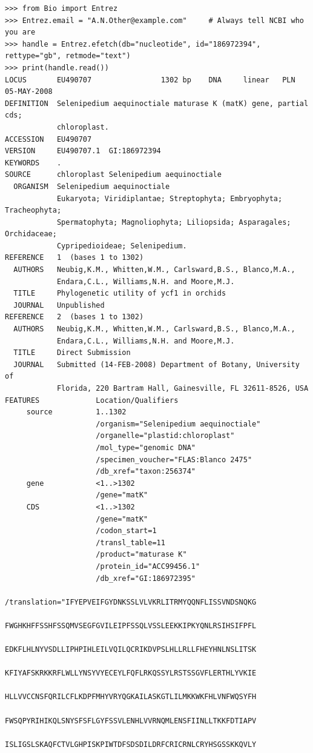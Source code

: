 \documentclass{report}
\begin{document}
\begin{verbatim}
>>> from Bio import Entrez
>>> Entrez.email = "A.N.Other@example.com"     # Always tell NCBI who you are
>>> handle = Entrez.efetch(db="nucleotide", id="186972394", rettype="gb", retmode="text")
>>> print(handle.read())
LOCUS       EU490707                1302 bp    DNA     linear   PLN 05-MAY-2008
DEFINITION  Selenipedium aequinoctiale maturase K (matK) gene, partial cds;
            chloroplast.
ACCESSION   EU490707
VERSION     EU490707.1  GI:186972394
KEYWORDS    .
SOURCE      chloroplast Selenipedium aequinoctiale
  ORGANISM  Selenipedium aequinoctiale
            Eukaryota; Viridiplantae; Streptophyta; Embryophyta; Tracheophyta;
            Spermatophyta; Magnoliophyta; Liliopsida; Asparagales; Orchidaceae;
            Cypripedioideae; Selenipedium.
REFERENCE   1  (bases 1 to 1302)
  AUTHORS   Neubig,K.M., Whitten,W.M., Carlsward,B.S., Blanco,M.A.,
            Endara,C.L., Williams,N.H. and Moore,M.J.
  TITLE     Phylogenetic utility of ycf1 in orchids
  JOURNAL   Unpublished
REFERENCE   2  (bases 1 to 1302)
  AUTHORS   Neubig,K.M., Whitten,W.M., Carlsward,B.S., Blanco,M.A.,
            Endara,C.L., Williams,N.H. and Moore,M.J.
  TITLE     Direct Submission
  JOURNAL   Submitted (14-FEB-2008) Department of Botany, University of
            Florida, 220 Bartram Hall, Gainesville, FL 32611-8526, USA
FEATURES             Location/Qualifiers
     source          1..1302
                     /organism="Selenipedium aequinoctiale"
                     /organelle="plastid:chloroplast"
                     /mol_type="genomic DNA"
                     /specimen_voucher="FLAS:Blanco 2475"
                     /db_xref="taxon:256374"
     gene            <1..>1302
                     /gene="matK"
     CDS             <1..>1302
                     /gene="matK"
                     /codon_start=1
                     /transl_table=11
                     /product="maturase K"
                     /protein_id="ACC99456.1"
                     /db_xref="GI:186972395"
                     /translation="IFYEPVEIFGYDNKSSLVLVKRLITRMYQQNFLISSVNDSNQKG
                     FWGHKHFFSSHFSSQMVSEGFGVILEIPFSSQLVSSLEEKKIPKYQNLRSIHSIFPFL
                     EDKFLHLNYVSDLLIPHPIHLEILVQILQCRIKDVPSLHLLRLLFHEYHNLNSLITSK
                     KFIYAFSKRKKRFLWLLYNSYVYECEYLFQFLRKQSSYLRSTSSGVFLERTHLYVKIE
                     HLLVVCCNSFQRILCFLKDPFMHYVRYQGKAILASKGTLILMKKWKFHLVNFWQSYFH
                     FWSQPYRIHIKQLSNYSFSFLGYFSSVLENHLVVRNQMLENSFIINLLTKKFDTIAPV
                     ISLIGSLSKAQFCTVLGHPISKPIWTDFSDSDILDRFCRICRNLCRYHSGSSKKQVLY

\end{verbatim}
\end{document}
